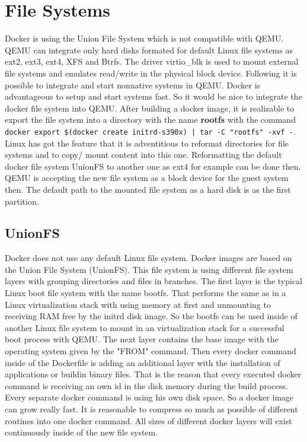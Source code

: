 \section{File Systems}\label{FileSystems}

Docker is using the Union File System which is not compatible with QEMU.
QEMU can integrate only hard disks formated for default Linux file systems as ext2, ext3, ext4, XFS and Btrfs. 
The driver virtio\_blk is used to mount external file systems and emulates read/write in the physical block device\cite{Barboza2018}. Following it is possible to integrate and start nonnative systems in QEMU. 
Docker is advantageous to setup and start systems fast. 
So it would be nice to integrate the docker file system into QEMU. After building a docker image, it is realizable to export the file system into a directory with the name \textbf{rootfs} with the command \lstinline!docker export $(docker create initrd-s390x) | tar -C "rootfs" -xvf -!. \\

Linux has got the feature that it is adventitious to reformat directories for file systems and to copy/ mount content into this one. Reformatting the default docker file system UnionFS to another one as ext4 for example can be done then. \\
QEMU is accepting the new file system as a block device for the guest system then. The default path to the mounted file system as a hard disk is  as the first partition\cite[~p.22]{White2020}.

\subsection{UnionFS}\label{UnionFS}

Docker does not use any default Linux file system. 
Docker images are based on the Union File System (UnionFS)\cite[~p.21]{Ashraf2015}. 
This file system is using different file system layers with grouping directories and files in branches. 
The first layer is the typical Linux boot file system with the name bootfs. 
That performs the same as in a Linux virtualization stack with using memory at first and unmounting to receiving RAM free by the initrd disk image. 
So the bootfs can be used inside of another Linux file system to mount in an virtualization stack for a successful boot process with QEMU.
The next layer contains the base image with the operating system given by the "FROM" command.
Then every docker command inside of the Dockerfile is adding an additional layer with the installation of applications or buildin binary files.
That is the reason that every executed docker command is receiving an own id in the disk memory during the build process.
Every separate docker command is using his own disk space. So a docker image can grow really fast.
It is reasonable to compress so much as possible of different routines into one docker command. 
All sizes of different docker layers will exist continuously inside of the new file system.

